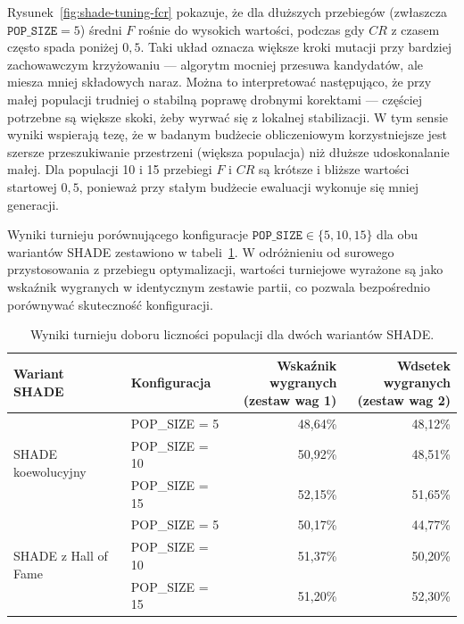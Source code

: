 Rysunek~\ref{fig:shade-tuning-fcr} pokazuje, że dla dłuższych przebiegów (zwłaszcza \(\texttt{POP\_SIZE}=5\)) średni \(F\) rośnie do wysokich wartości, podczas gdy \(CR\) z czasem często spada poniżej \(0{,}5\). Taki układ oznacza większe kroki mutacji przy bardziej zachowawczym krzyżowaniu --- algorytm mocniej przesuwa kandydatów, ale miesza mniej składowych naraz. Można to interpretować następująco, że przy małej populacji trudniej o stabilną poprawę drobnymi korektami --- częściej potrzebne są większe skoki, żeby wyrwać się z lokalnej stabilizacji. W tym sensie wyniki wspierają tezę, że w badanym budżecie obliczeniowym korzystniejsze jest szersze przeszukiwanie przestrzeni (większa populacja) niż dłuższe udoskonalanie małej. Dla populacji 10 i 15 przebiegi \(F\) i \(CR\) są krótsze i bliższe wartości startowej \(0{,}5\), ponieważ przy stałym budżecie ewaluacji wykonuje się mniej generacji.

Wyniki turnieju porównującego konfiguracje \(\texttt{POP\_SIZE}\in\{5,10,15\}\) dla obu wariantów SHADE zestawiono w tabeli~\ref{tab:shade-popsize-results}. W odróżnieniu od surowego przystosowania z przebiegu optymalizacji, wartości turniejowe wyrażone są jako wskaźnik wygranych w identycznym zestawie partii, co pozwala bezpośrednio porównywać skuteczność konfiguracji.

\begin{table}[!ht]
\centering
\small
\begin{tabular}{llrr}
\toprule
Wariant SHADE & Konfiguracja & \makecell{Wskaźnik wygranych\\(zestaw wag 1)} & \makecell{Wdsetek wygranych\\(zestaw wag 2)} \\
\midrule
\multirow{3}{*}{SHADE koewolucyjny}
    & POP\_SIZE = 5  & 48,64\% & 48,12\% \\
    & POP\_SIZE = 10 & 50,92\% & 48,51\% \\
    & POP\_SIZE = 15 & 52,15\% & 51,65\% \\
\midrule
\multirow{3}{*}{SHADE z Hall of Fame}
    & POP\_SIZE = 5  & 50,17\% & 44,77\% \\
    & POP\_SIZE = 10 & 51,37\% & 50,20\% \\
    & POP\_SIZE = 15 & 51,20\% & 52,30\% \\
\bottomrule
\end{tabular}
\caption{Wyniki turnieju doboru liczności populacji dla dwóch wariantów SHADE.}
\label{tab:shade-popsize-results}
\end{table}

